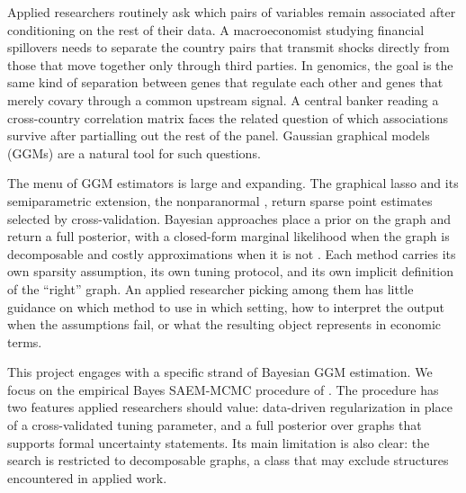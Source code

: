 
Applied researchers routinely ask which pairs of variables remain associated after conditioning on the rest of their data. A macroeconomist studying financial spillovers needs to separate the country pairs that transmit shocks directly from those that move together only through third parties. In genomics, the goal is the same kind of separation between genes that regulate each other and genes that merely covary through a common upstream signal. A central banker reading a cross-country correlation matrix faces the related question of which associations survive after partialling out the rest of the panel. Gaussian graphical models (GGMs) are a natural tool for such questions.

The menu of GGM estimators is large and expanding. The graphical lasso \parencite{friedman2008sparse} and its semiparametric extension, the nonparanormal \parencite{liu2009nonparanormal}, return sparse point estimates selected by cross-validation. Bayesian approaches place a prior on the graph and return a full posterior, with a closed-form marginal likelihood when the graph is decomposable \parencite{dawid1993hyper,lauritzen1996graphical} and costly approximations when it is not \parencite{mohammadi2015bdgraph}. Each method carries its own sparsity assumption, its own tuning protocol, and its own implicit definition of the ``right'' graph. An applied researcher picking among them has little guidance on which method to use in which setting, how to interpret the output when the assumptions fail, or what the resulting object represents in economic terms.

This project engages with a specific strand of Bayesian GGM estimation. We focus on the empirical Bayes SAEM-MCMC procedure of \textcite{donnet2012empirical}. The procedure has two features applied researchers should value: data-driven regularization in place of a cross-validated tuning parameter, and a full posterior over graphs that supports formal uncertainty statements. Its main limitation is also clear: the search is restricted to decomposable graphs, a class that may exclude structures encountered in applied work.

